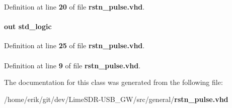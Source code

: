 Definition at line {\bf 20} of file {\bf rstn\+\_\+pulse.\+vhd}.

\paragraph[{rstn\+\_\+pulse\+\_\+out}]{ {\bfseries \textcolor{keywordflow}{out}\textcolor{vhdlchar}{ }} {\bfseries \textcolor{comment}{std\+\_\+logic}\textcolor{vhdlchar}{ }} \hspace{0.3cm}{\ttfamily [Port]}}\label{classrstn__pulse_a9f7d5ef14421e0d5f885c3680ac77ce3}


Definition at line {\bf 25} of file {\bf rstn\+\_\+pulse.\+vhd}.

\paragraph[{std\+\_\+logic\+\_\+1164}]{\hspace{0.3cm}{\ttfamily [Package]}}\label{classrstn__pulse_acd03516902501cd1c7296a98e22c6fcb}


Definition at line {\bf 9} of file {\bf rstn\+\_\+pulse.\+vhd}.



The documentation for this class was generated from the following file\+:\begin{DoxyCompactItemize}
\item 
/home/erik/git/dev/\+Lime\+S\+D\+R-\/\+U\+S\+B\+\_\+\+G\+W/src/general/{\bf rstn\+\_\+pulse.\+vhd}\end{DoxyCompactItemize}
